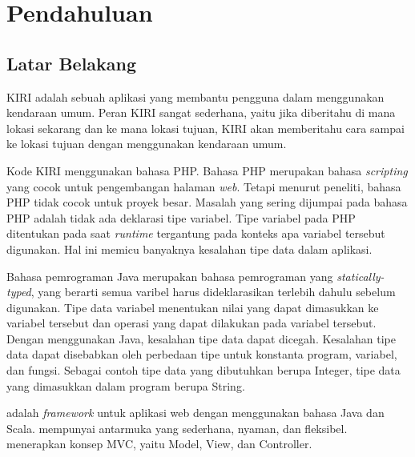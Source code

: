 \chapter{Pendahuluan}
\label{chap:pendahuluan}

\section{Latar Belakang}
\label{sec:latarbelakang}

KIRI \cite{statickiri} adalah sebuah aplikasi yang membantu pengguna dalam menggunakan kendaraan umum. Peran KIRI sangat sederhana, yaitu jika diberitahu di mana lokasi sekarang dan ke mana lokasi tujuan, KIRI akan memberitahu cara sampai ke lokasi tujuan dengan menggunakan kendaraan umum. 

Kode KIRI \cite{githubkiri} menggunakan bahasa PHP. Bahasa PHP \cite{phpnet} merupakan bahasa \textit{scripting} yang cocok untuk pengembangan halaman \textit{web}. Tetapi menurut peneliti, bahasa PHP tidak cocok untuk proyek besar. Masalah yang sering dijumpai pada bahasa PHP adalah tidak ada deklarasi tipe variabel. Tipe variabel pada PHP ditentukan pada saat \textit{runtime} tergantung pada konteks apa variabel tersebut digunakan. Hal ini memicu banyaknya kesalahan tipe data dalam aplikasi.

Bahasa pemrograman Java \cite{java} merupakan bahasa pemrograman yang \textit{statically-typed}, yang berarti semua varibel harus dideklarasikan terlebih dahulu sebelum digunakan. Tipe data variabel menentukan nilai yang dapat dimasukkan ke variabel tersebut dan operasi yang dapat dilakukan pada variabel tersebut. Dengan menggunakan Java, kesalahan tipe data dapat dicegah. Kesalahan tipe data dapat disebabkan oleh perbedaan tipe untuk konstanta program, variabel, dan fungsi. Sebagai contoh tipe data yang dibutuhkan berupa Integer, tipe data yang dimasukkan dalam program berupa String.

\play \cite{playforjava} adalah \textit{framework} untuk aplikasi web dengan menggunakan bahasa Java dan Scala. \play mempunyai antarmuka yang sederhana, nyaman, dan fleksibel. \play menerapkan konsep MVC, yaitu Model, View, dan Controller. 

